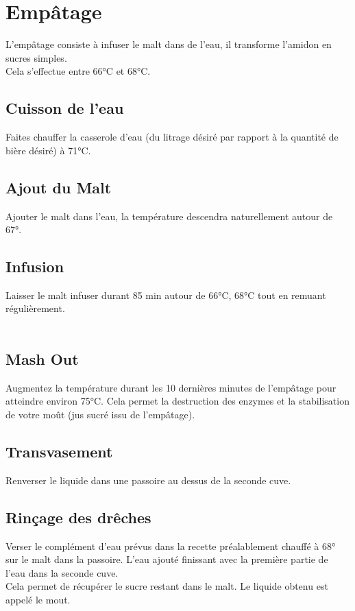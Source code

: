 \documentclass[twoside,twocolumn]{report}
\begin{document}
	\section{Empâtage}
		L'empâtage consiste à infuser le malt dans de l'eau, il transforme l'amidon en sucres simples.\\
		Cela s'effectue entre 66°C et 68°C.
		\subsection{Cuisson de l'eau}
			Faites chauffer la casserole d'eau (du litrage désiré par rapport à la quantité de bière désiré) à 71°C.\\
		\subsection{Ajout du Malt}
			Ajouter le malt dans l'eau, la température descendra naturellement autour de 67°.
		\subsection{Infusion}
			Laisser le malt infuser durant 85 min autour de 66°C, 68°C tout en remuant régulièrement.\\ \\
		\subsection{ Mash Out}
			 Augmentez la température durant les 10 dernières minutes de l’empâtage pour atteindre environ 75°C. Cela  permet la destruction des
			enzymes et la stabilisation de votre moût  (jus  sucré issu  de l’empâtage).
		\subsection{Transvasement }
			Renverser le liquide dans une passoire au dessus de la seconde cuve.\\
		\subsection{Rinçage des drêches}
			Verser le complément d'eau prévus dans la recette préalablement chauffé à 68° sur le malt dans la passoire. L'eau ajouté finissant avec la première partie de l'eau dans la seconde cuve.\\
			Cela permet de récupérer le sucre restant dans le malt. Le liquide obtenu est appelé le mout.
			
\end{document}

